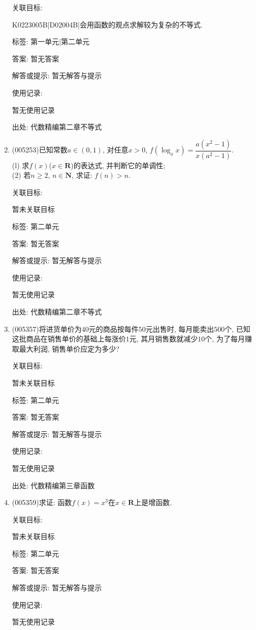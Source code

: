 \documentclass[10pt,a4paper]{article}
\begin{document}
\begin{enumerate}[1.]
关联目标:

K0223005B|D02004B|会用函数的观点求解较为复杂的不等式.



标签: 第一单元|第二单元

答案: 暂无答案

解答或提示: 暂无解答与提示

使用记录:

暂无使用记录


出处: 代数精编第二章不等式
\item { (005253)}已知常数$a\in (0,1)$, 对任意$x>0$, $f(\log_ax)=\dfrac{a(x^2-1)}{x(a^2-1)}$.\\
(l) 求$f(x)$($x\in \mathbf{R}$)的表达式, 并判断它的单调性;\\
(2) 若$n\ge 2$, $n\in \mathbf{N}$, 求证: $f(n)>n$.


关联目标:

暂未关联目标



标签: 第二单元

答案: 暂无答案

解答或提示: 暂无解答与提示

使用记录:

暂无使用记录


出处: 代数精编第二章不等式
\item { (005357)}将进货单价为$40$元的商品按每件$50$元出售时, 每月能卖出$500$个, 已知这批商品在销售单价的基础上每涨价$1$元, 其月销售数就减少$10$个, 为了每月赚取最大利润, 销售单价应定为多少?


关联目标:

暂未关联目标



标签: 第二单元

答案: 暂无答案

解答或提示: 暂无解答与提示

使用记录:

暂无使用记录


出处: 代数精编第三章函数
\item { (005359)}求证: 函数$f(x)=x^3$在$x\in \mathbf{R}$上是增函数.


关联目标:

暂未关联目标



标签: 第二单元

答案: 暂无答案

解答或提示: 暂无解答与提示

使用记录:

暂无使用记录



\end{enumerate}
\end{document}
